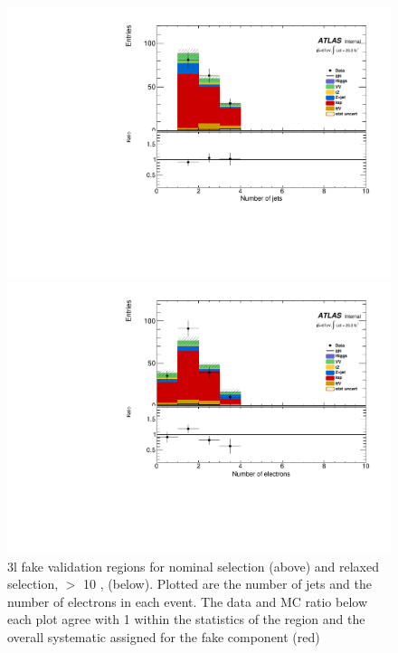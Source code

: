 \begin{figure}[!htbp]
\begin{minipage}[h]{0.5\textwidth}
    \centering \includegraphics[width=\textwidth]{figs/fake/plotCand_3lep_LowNJet_NJet}
  \end{minipage}\hfill
  \begin{minipage}[h]{0.5\textwidth}
    \centering \includegraphics[width=\textwidth]{figs/fake/plotCand_3lep_LowNJet_NElec}
  \end{minipage}\hfill
  \caption{ 3l fake validation regions for nominal \pt selection (above) and relaxed \pt selection, $>$ 10 \gevc, (below). Plotted are the number of jets and the number of electrons in each event. The data and MC ratio below each plot agree with 1 within the statistics of the region and the overall systematic assigned for the fake component (red)}  
  \label{figure:background_3lvaldiation}
\end{figure} 



